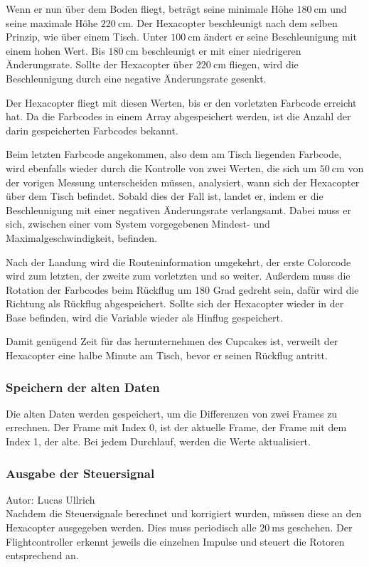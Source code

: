     Wenn er nun über dem Boden fliegt, beträgt seine minimale Höhe $\SI{180}{\centi\metre}$ und seine maximale Höhe $\SI{220}{\centi\metre}$.
    Der Hexacopter beschleunigt nach dem selben Prinzip, wie über einem Tisch. Unter $\SI{100}{\centi\metre}$ ändert er seine Beschleunigung mit einem hohen Wert. Bis $\SI{180}{\centi\metre}$ beschleunigt er mit einer niedrigeren Änderungsrate. Sollte der Hexacopter über $\SI{220}{\centi\metre}$ fliegen, wird die Beschleunigung durch eine negative Änderungsrate gesenkt.

    Der Hexacopter fliegt mit diesen Werten, bis er den vorletzten Farbcode erreicht hat. Da die Farbcodes in einem Array abgespeichert werden, ist die Anzahl der darin gespeicherten Farbcodes bekannt.

    Beim letzten Farbcode angekommen, also dem am Tisch liegenden Farbcode, wird ebenfalls wieder durch die Kontrolle von zwei Werten, die sich um $\SI{50}{\centi\metre}$ von der vorigen Messung unterscheiden müssen, analysiert, wann sich der Hexacopter über dem Tisch befindet. Sobald dies der Fall ist, landet er, indem er die Beschleunigung mit einer negativen Änderungsrate verlangsamt. Dabei muss er sich, zwischen einer vom System vorgegebenen Mindest- und Maximalgeschwindigkeit, befinden.

    Nach der Landung wird die Routeninformation umgekehrt, der erste Colorcode wird zum letzten, der zweite zum vorletzten und so weiter. Außerdem muss die Rotation der Farbcodes beim Rückflug um 180 Grad gedreht sein, dafür wird die Richtung als Rückflug abgespeichert. Sollte sich der Hexacopter wieder in der Base befinden, wird die Variable wieder als Hinflug gespeichert.

    Damit genügend Zeit für das herunternehmen des Cupcakes ist, verweilt der Hexacopter eine halbe Minute am Tisch, bevor er seinen Rückflug antritt.

    \subsubsection{Speichern der alten Daten}
    Die alten Daten werden gespeichert, um die Differenzen von zwei Frames zu errechnen. Der Frame mit Index 0, ist der aktuelle Frame, der Frame mit dem Index 1, der alte. Bei jedem Durchlauf, werden die Werte aktualisiert.

    \subsubsection{Ausgabe der Steuersignal}
    Autor: Lucas Ullrich\\
    Nachdem die Steuersignale berechnet und korrigiert wurden, müssen diese an den Hexacopter ausgegeben werden. Dies muss periodisch alle $\SI{20}{\milli\second}$ geschehen.
    Der Flightcontroller erkennt jeweils die einzelnen Impulse und steuert die Rotoren entsprechend an.

